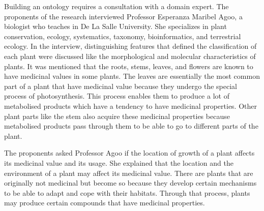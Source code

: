 %
%
%                 
\label{sec:appendixe}

Building an ontology requires a consultation with a domain expert. The proponents of the research interviewed Professor Esperanza Maribel Agoo, a biologist who teaches in De La Salle University. She specializes in plant conservation, ecology, systematics, taxonomy, bioinformatics, and terrestrial ecology. In the interview, distinguishing features that defined the classification of each plant were discussed like the morphological and molecular characteristics of plants. It was mentioned that the roots, stems, leaves, and flowers are known to have medicinal values in some plants. The leaves are essentially the most common part of a plant that have medicinal value because they undergo the special process of photosynthesis. This process enables them to produce a lot of metabolised products which have a tendency to have medicinal properties. Other plant parts like the stem also acquire these medicinal properties because metabolised products pass through them to be able to go to different parts of the plant.

The proponents asked Professor Agoo if  the location of growth of a plant affects its medicinal value and its usage. She explained that the location and the environment of a plant may affect its medicinal value. There are plants that are originally not medicinal but become so because they develop certain mechanisms to be able to adapt and cope with their habitats. Through that process, plants may produce certain compounds that have medicinal properties.



